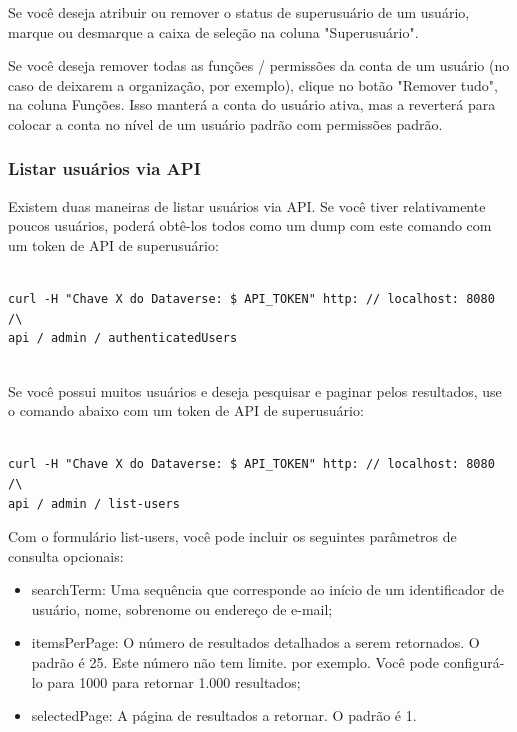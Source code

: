 \documentclass[12pt,hidelinks]{article}
\begin{document}
Se você deseja atribuir ou remover o status de superusuário de um usuário, marque ou desmarque a caixa de seleção na coluna "Superusuário".

Se você deseja remover todas as funções / permissões da conta de um usuário (no caso de deixarem a organização, por exemplo), clique no botão "Remover tudo", na coluna Funções. Isso manterá a conta do usuário ativa, mas a reverterá para colocar a conta no nível de um usuário padrão com permissões padrão.

\subsubsection{Listar usuários via API}

\qquad Existem duas maneiras de listar usuários via API. Se você tiver relativamente poucos usuários, poderá obtê-los todos como um dump com este comando com um token de API de superusuário:

\begin{verbatim}

curl -H "Chave X do Dataverse: $ API_TOKEN" http: // localhost: 8080 /\ 
api / admin / authenticatedUsers
 

\end{verbatim}
 
Se você possui muitos usuários e deseja pesquisar e paginar pelos resultados, use o comando abaixo com um token de API de superusuário:

\begin{verbatim}

curl -H "Chave X do Dataverse: $ API_TOKEN" http: // localhost: 8080 /\ 
api / admin / list-users

\end{verbatim}

Com o formulário list-users, você pode incluir os seguintes parâmetros de consulta opcionais:

\begin{itemize}
   
 \item searchTerm: Uma sequência que corresponde ao início de um identificador de usuário, nome, sobrenome ou endereço de e-mail;
 
 \item itemsPerPage: O número de resultados detalhados a serem retornados. O padrão é 25. Este número não tem limite. por exemplo. Você pode configurá-lo para 1000 para retornar 1.000 resultados;
 
 \item selectedPage: A página de resultados a retornar. O padrão é 1.

\end{itemize}
\end{document}
